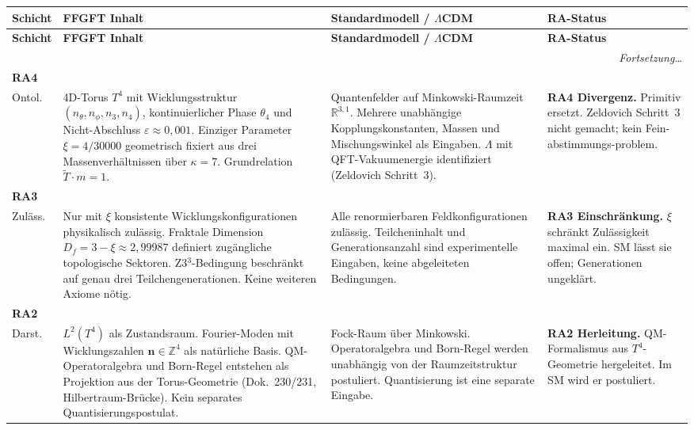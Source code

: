 \renewcommand{\arraystretch}{1.4}
{\small
\begin{longtable}{p{2.0cm}p{4.4cm}p{4.4cm}p{2.55cm}}

\toprule
\textbf{Schicht} & \textbf{FFGFT Inhalt} & \textbf{Standardmodell / $\Lambda$CDM} & \textbf{RA-Status} \\
\midrule
\endfirsthead
\toprule
\textbf{Schicht} & \textbf{FFGFT Inhalt} & \textbf{Standardmodell / $\Lambda$CDM} & \textbf{RA-Status} \\
\midrule
\endhead
\midrule\multicolumn{4}{r}{\footnotesize\itshape Fortsetzung\ldots}\\\endfoot
\bottomrule\endlastfoot
\sloppy\raggedright

\textbf{RA4}\\Ontol. &
4D-Torus $T^4$ mit Wicklungsstruktur $(n_\theta, n_\phi, n_3, n_4)$, kontinuierlicher Phase $\theta_4$ und Nicht-Abschluss $\varepsilon \approx 0{,}001$. Einziger Parameter $\xi = 4/30000$ geometrisch fixiert aus drei Massenverhältnissen über $\kappa = 7$. Grundrelation $\tilde{T}\cdot m = 1$. &
Quantenfelder auf Minkowski-Raumzeit $\mathbb{R}^{3,1}$. Mehrere unabhängige Kopplungskonstanten, Massen und Mischungswinkel als Eingaben. $\Lambda$ mit QFT-Vakuumenergie identifiziert (Zeldovich Schritt~3). &
\textbf{RA4 Divergenz.} Primitiv ersetzt. Zeldovich Schritt~3 nicht gemacht; kein Fein-\allowbreak abstimmungs-\allowbreak problem. \\

\midrule

\textbf{RA3}\\Zuläss. &
Nur mit $\xi$ konsistente Wicklungskonfigurationen physikalisch zulässig. Fraktale Dimension $D_f = 3-\xi \approx 2{,}99987$ definiert zugängliche topologische Sektoren. Z3$^3$-Bedingung beschränkt auf genau drei Teilchengenerationen. Keine weiteren Axiome nötig. &
Alle renormierbaren Feldkonfigurationen zulässig. Teilcheninhalt und Generationsanzahl sind experimentelle Eingaben, keine abgeleiteten Bedingungen. &
\textbf{RA3 Einschränkung.} $\xi$ schränkt Zulässigkeit maximal ein. SM lässt sie offen; Generationen ungeklärt. \\

\midrule

\textbf{RA2}\\Darst. &
$L^2(T^4)$ als Zustandsraum. Fourier-Moden mit Wicklungszahlen $\mathbf{n}\in\mathbb{Z}^4$ als natürliche Basis. QM-Operatoralgebra und Born-Regel entstehen als Projektion aus der Torus-Geometrie (Dok.~230/231, Hilbertraum-Brücke). Kein separates Quantisierungspostulat. &
Fock-Raum über Minkowski. Operatoralgebra und Born-Regel werden unabhängig von der Raumzeitstruktur postuliert. Quantisierung ist eine separate Eingabe. &
\textbf{RA2 Herleitung.} QM-Formalismus aus $T^4$-Geometrie hergeleitet. Im SM wird er postuliert. \\


\end{longtable}}
